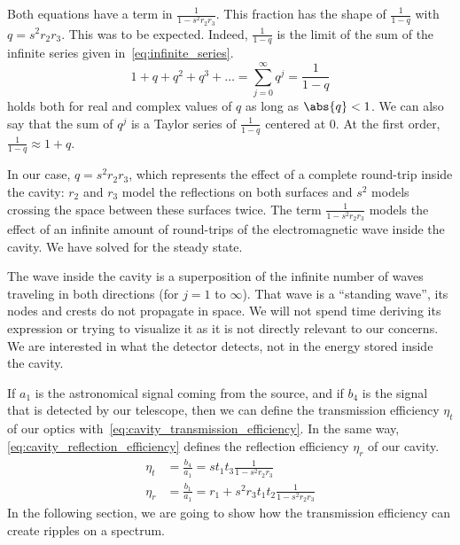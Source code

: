 Both equations have a term in $\frac{1}{1 - s^2 r_2 r_3}$.
This fraction has the shape of $\frac{1}{1 - q}$ with $q=s^2 r_2 r_3$.
This was to be expected.
Indeed, $\frac{1}{1 - q}$ is the limit of the sum of the infinite series given in~\cref{eq:infinite_series}.
\begin{equation}
    1 + q + q^2 + q^3 + \ldots = \sum_{j=0}^\infty q^j = \frac{1}{1-q}
    \label{eq:infinite_series}
\end{equation}
 holds both for real and complex values of $q$ as long as $\abs{q} < 1$.
We can also say that the sum of $q^j$ is a Taylor series of $\frac{1}{1-q}$ centered at 0.
At the first order, $\frac{1}{1-q} \approx 1 + q$.

In our case, $q=s^2 r_2 r_3$, which represents the effect of a complete round-trip inside the cavity: $r_2$ and $r_3$ model the reflections on both surfaces and $s^2$ models crossing the space between these surfaces twice.
The term $\frac{1}{1 - s^2 r_2 r_3}$ models the effect of an infinite amount of round-trips of the electromagnetic wave inside the cavity.
We have solved for the steady state.

The wave inside the cavity is a superposition of the infinite number of waves traveling in both directions (for $j=1$ to $\infty$).
That wave is a ``standing wave'', its nodes and crests do not propagate in space.
We will not spend time deriving its expression or trying to visualize it as it is not directly relevant to our concerns.
We are interested in what the detector detects, not in the energy stored inside the cavity.

If $a_1$ is the astronomical signal coming from the source, and if $b_4$ is the signal that is detected by our telescope, then we can define the transmission efficiency $\eta_t$ of our optics with~\cref{eq:cavity_transmission_efficiency}.
In the same way, \cref{eq:cavity_reflection_efficiency} defines the reflection efficiency $\eta_r$ of our cavity.
\begin{align}
    \eta_t &= \frac{b_4}{a_1} = s t_1 t_3 \frac{1}{1 - s^2 r_2 r_3}
    \label{eq:cavity_transmission_efficiency}
    \\
    \eta_r &= \frac{b_1}{a_1} = r_1 + s^2 r_3 t_1 t_2 \frac{1}{1 - s^2 r_2 r_3}
    \label{eq:cavity_reflection_efficiency}
\end{align}
In the following section, we are going to show how the transmission efficiency can create ripples on a spectrum.



